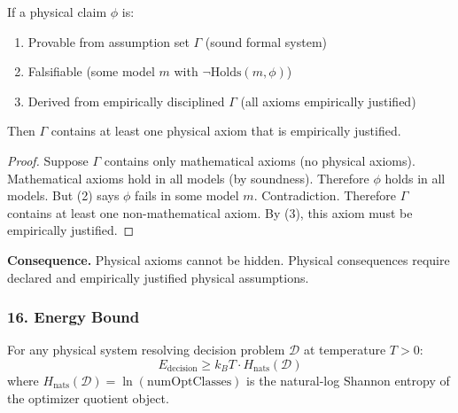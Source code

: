\begin{theorem}\label{thm:assumption-necessity}
If a physical claim $\phi$ is:
\begin{enumerate}
\item Provable from assumption set $\Gamma$ (sound formal system)
\item Falsifiable (some model $m$ with $\neg \mathrm{Holds}(m, \phi)$)
\item Derived from empirically disciplined $\Gamma$ (all axioms empirically justified)
\end{enumerate}
Then $\Gamma$ contains at least one physical axiom that is empirically justified.
\end{theorem}

\begin{proof}
Suppose $\Gamma$ contains only mathematical axioms (no physical axioms). Mathematical axioms hold in all models (by soundness). Therefore $\phi$ holds in all models. But (2) says $\phi$ fails in some model $m$. Contradiction. Therefore $\Gamma$ contains at least one non-mathematical axiom. By (3), this axiom must be empirically justified.
\end{proof}

\noindent\textbf{Consequence.} Physical axioms cannot be hidden. Physical consequences require declared and empirically justified physical assumptions.

\subsubsection{16. Energy Bound}

\begin{theorem}\label{thm:energy-information}
For any physical system resolving decision problem $\mathcal{D}$ at temperature $T > 0$:
\[
  E_{\mathrm{decision}} \geq k_B T \cdot H_{\mathrm{nats}}(\mathcal{D})
\]
where $H_{\mathrm{nats}}(\mathcal{D}) = \ln(\mathrm{numOptClasses})$ is the natural-log Shannon entropy of the optimizer quotient object.
\end{theorem}


